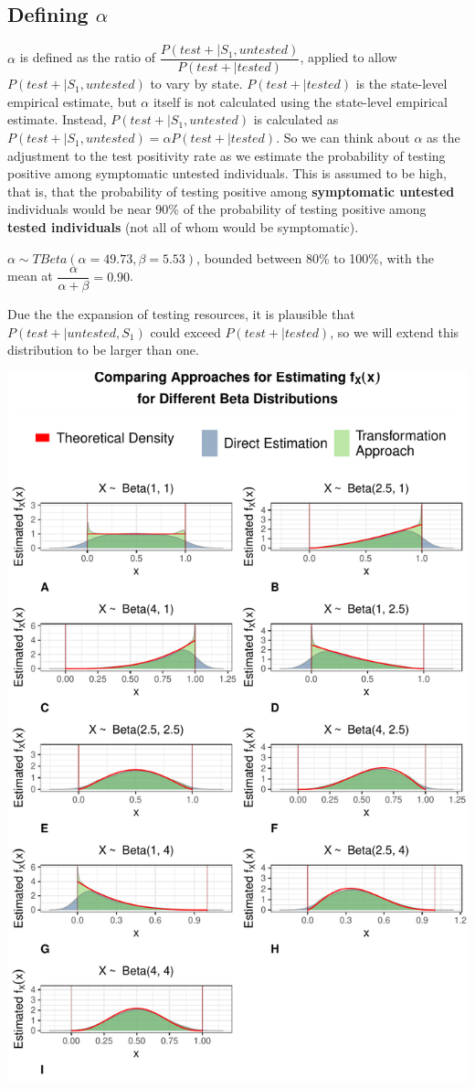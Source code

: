 \documentclass[12pt,twoside]{smiththesis}
\begin{document}
\hypertarget{defining-alpha}{%
\subsection{\texorpdfstring{Defining \(\alpha\)}{Defining \textbackslash alpha}}\label{defining-alpha}}

\(\alpha\) is defined as the ratio of \(\dfrac{P(test + |S_1, untested)}{P(test+|tested)}\), applied to allow \(P(test + |S_1, untested)\) to vary by state. \(P(test+|tested)\) is the state-level empirical estimate, but \(\alpha\) itself is not calculated using the state-level empirical estimate. Instead, \(P(test+|S_1, untested)\) is calculated as \(P(test+|S_1, untested) =\alpha P(test+|tested)\). So we can think about \(\alpha\) as the adjustment to the test positivity rate as we estimate the probability of testing positive among symptomatic untested individuals. This is assumed to be high, that is, that the probability of testing positive among \textbf{symptomatic untested} individuals would be near 90\% of the probability of testing positive among \textbf{tested individuals} (not all of whom would be symptomatic).

\(\alpha \sim TBeta(\alpha = 49.73, \beta = 5.53)\), bounded between 80\% to 100\%, with the mean at \(\dfrac{\alpha}{\alpha + \beta} = 0.90\).

Due the the expansion of testing resources, it is plausible that \(P(test +|untested,S_1)\) could exceed \(P(test+|tested)\), so we will extend this distribution to be larger than one.

\includegraphics[width=0.5\linewidth]{thesis_files/figure-latex/unnamed-chunk-35-1}
\end{document}
